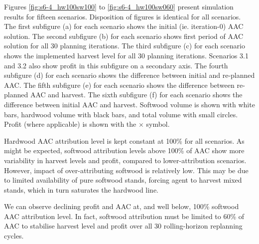 Figures \ref{fig:s6-4_hw100sw100} to \ref{fig:s6-4_hw100sw060} present
simulation results for fifteen scenarios. %
Disposition of figures is identical for all scenarios. The
first subfigure (a) for each scenario shows the initial
(ie. iteration-0) AAC solution. The second subfigure (b) for each
scenario shows first period of AAC solution for all 30 planning
iterations. The third subfigure (c) for each scenario shows the
implemented harvest level for all 30 planning iterations. Scenarios
3.1 and 3.2 also show profit in this subfigure on a secondary
axis. The fourth subfigure (d) for each scenario shows the difference
between initial and re-planned AAC. The fifth subfigure (e) for each
scenario shows the difference between re-planned AAC and harvest.  The
sixth subfigure (f) for each scenario shows the difference between
initial AAC and harvest. Softwood volume is shown with white bars,
hardwood volume with black bars, and total volume with small
circles. Profit (where applicable) is shown with the $\times$
symbol. 

Hardwood AAC attribution level is kept constant at 100\% for all scenarios. 
As might be expected, softwood attribution levels above 100\% of AAC show more variability in harvest levels and profit, compared to lower-attribution scenarios.
However, impact of over-attributing softwood is relatively low. This may be due to limited availability of pure softwood stands, forcing agent to harvest mixed stands, which in turn saturates the hardwood line.

We can observe declining profit and AAC at, and well below, 100\% softwood AAC attribution level. 
In fact, softwood attribution must be limited to 60\% of AAC to stabilise harvest level and profit over all 30 rolling-horizon replanning cycles.


